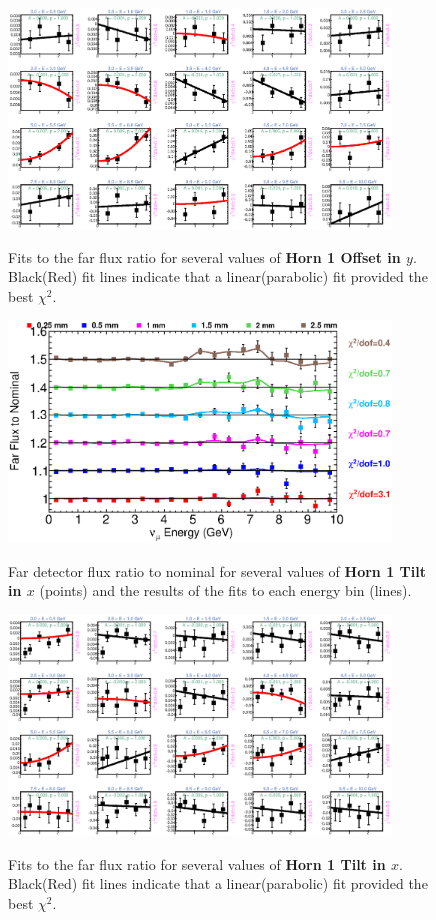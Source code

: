 \begin{figure}[hb]
  \begin{center}
    {\includegraphics[width=4.0in]{figures/Horn1YOffset_far_fits.eps}}
  \end{center}
\caption{ Fits to the far flux ratio for several values of {\bf Horn 1 Offset in $y$}. Black(Red) fit lines indicate that a linear(parabolic) fit provided the best $\chi^2$. }
\end{figure}

\begin{figure}[ht]
  \begin{center}
    {\includegraphics[width=4.0in]{figures/Horn1XTilt_far_summary.eps}}
  \end{center}
\caption{ Far detector flux ratio to nominal for several values of {\bf Horn 1 Tilt in $x$} (points) and the results of the fits to each energy bin (lines).}
\end{figure}

\begin{figure}[hb]
  \begin{center}
    {\includegraphics[width=4.0in]{figures/Horn1XTilt_far_fits.eps}}
  \end{center}
\caption{ Fits to the far flux ratio for several values of {\bf Horn 1 Tilt in $x$}. Black(Red) fit lines indicate that a linear(parabolic) fit provided the best $\chi^2$. }
\end{figure}

